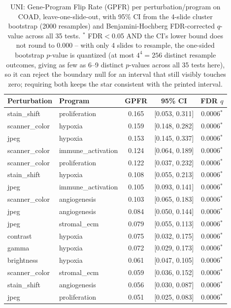\begin{table}[t]
\centering
\caption{UNI: Gene-Program Flip Rate (GPFR) per perturbation/program on COAD, leave-one-slide-out, with 95\% CI from the 4-slide cluster bootstrap (2000 resamples) and Benjamini-Hochberg FDR-corrected $q$-value across all 35 tests. $^{*}$ FDR$<$0.05 AND the CI's lower bound does not round to 0.000 -- with only 4 slides to resample, the one-sided bootstrap $p$-value is quantized (at most $4^4=256$ distinct resample outcomes, giving as few as 6--9 distinct $p$-values across all 35 tests here), so it can reject the boundary null for an interval that still visibly touches zero; requiring both keeps the star consistent with the printed interval.}
\label{tab:gpfr_loso_coad_uni}
\begin{tabular}{llccc}
\toprule
Perturbation & Program & GPFR & 95\% CI & FDR $q$ \\
\midrule
stain\_shift & proliferation & 0.165 & [0.053, 0.311] & 0.0006$^{*}$ \\
scanner\_color & hypoxia & 0.159 & [0.148, 0.282] & 0.0006$^{*}$ \\
jpeg & hypoxia & 0.153 & [0.145, 0.337] & 0.0006$^{*}$ \\
scanner\_color & immune\_activation & 0.124 & [0.064, 0.189] & 0.0006$^{*}$ \\
scanner\_color & proliferation & 0.122 & [0.037, 0.232] & 0.0006$^{*}$ \\
stain\_shift & hypoxia & 0.108 & [0.055, 0.213] & 0.0006$^{*}$ \\
jpeg & immune\_activation & 0.105 & [0.093, 0.141] & 0.0006$^{*}$ \\
scanner\_color & angiogenesis & 0.103 & [0.065, 0.183] & 0.0006$^{*}$ \\
jpeg & angiogenesis & 0.084 & [0.050, 0.144] & 0.0006$^{*}$ \\
jpeg & stromal\_ecm & 0.079 & [0.055, 0.113] & 0.0006$^{*}$ \\
contrast & hypoxia & 0.075 & [0.032, 0.175] & 0.0006$^{*}$ \\
gamma & hypoxia & 0.072 & [0.029, 0.173] & 0.0006$^{*}$ \\
brightness & hypoxia & 0.061 & [0.047, 0.105] & 0.0006$^{*}$ \\
scanner\_color & stromal\_ecm & 0.059 & [0.036, 0.152] & 0.0006$^{*}$ \\
stain\_shift & angiogenesis & 0.056 & [0.030, 0.087] & 0.0006$^{*}$ \\
jpeg & proliferation & 0.051 & [0.025, 0.083] & 0.0006$^{*}$ \\

\end{tabular}
\end{table}
